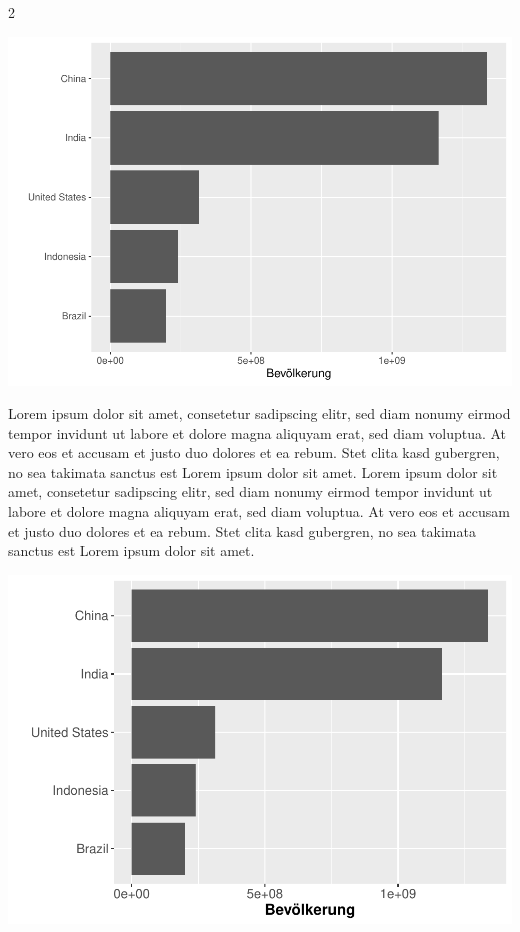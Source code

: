 \documentclass[
  a4paper,
  twoside]{article}
\begin{document}
\begin {multicols}{2}

\includegraphics[width=1\linewidth]{PDF_Latex_files/figure-latex/unnamed-chunk-4-1}

Lorem ipsum dolor sit amet, consetetur sadipscing elitr, sed diam nonumy eirmod tempor invidunt ut labore et dolore magna aliquyam erat, sed diam voluptua. At vero eos et accusam et justo duo dolores et ea rebum. Stet clita kasd gubergren, no sea takimata sanctus est Lorem ipsum dolor sit amet. Lorem ipsum dolor sit amet, consetetur sadipscing elitr, sed diam nonumy eirmod tempor invidunt ut labore et dolore magna aliquyam erat, sed diam voluptua. At vero eos et accusam et justo duo dolores et ea rebum. Stet clita kasd gubergren, no sea takimata sanctus est Lorem ipsum dolor sit amet.
\columnbreak

\includegraphics[width=1\linewidth]{PDF_Latex_files/figure-latex/unnamed-chunk-5-1}


\end{multicols}
\end{document}
